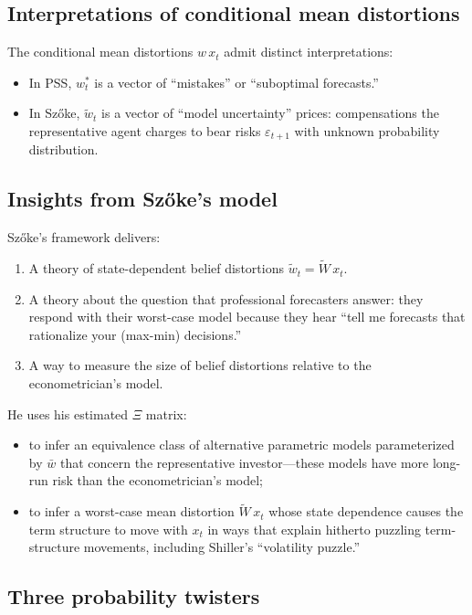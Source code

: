\documentclass[12pt]{article}
\theoremstyle{definition}
\begin{document}
\subsection{Interpretations of conditional mean distortions}

The conditional mean distortions $w\, x_t$ admit distinct
interpretations:
\begin{itemize}
\item In PSS, $w_t^*$ is a vector of ``mistakes'' or ``suboptimal
      forecasts.''
\item In Sz\H{o}ke, $\tilde w_t$ is a vector of ``model uncertainty''
      prices: compensations the representative agent charges to bear
      risks $\varepsilon_{t+1}$ with unknown probability distribution.
\end{itemize}

\subsection{Insights from Sz\H{o}ke's model}

Sz\H{o}ke's framework delivers:
\begin{enumerate}
\item A theory of state-dependent belief distortions
      $\tilde w_t = \tilde W\, x_t$.
\item A theory about the question that professional forecasters answer:
      they respond with their worst-case model because they hear ``tell
      me forecasts that rationalize your (max-min) decisions.''
\item A way to measure the size of belief distortions relative to the
      econometrician's model.
\end{enumerate}

He uses his estimated $\Xi$ matrix:
\begin{itemize}
\item to infer an equivalence class of alternative parametric models
      parameterized by $\bar w$ that concern the representative
      investor---these models have more long-run risk than the
      econometrician's model;
\item to infer a worst-case mean distortion $\tilde W\, x_t$ whose
      state dependence causes the term structure to move with $x_t$ in
      ways that explain hitherto puzzling term-structure movements,
      including Shiller's ``volatility puzzle.''
\end{itemize}

\subsection{Three probability twisters}
\end{document}
